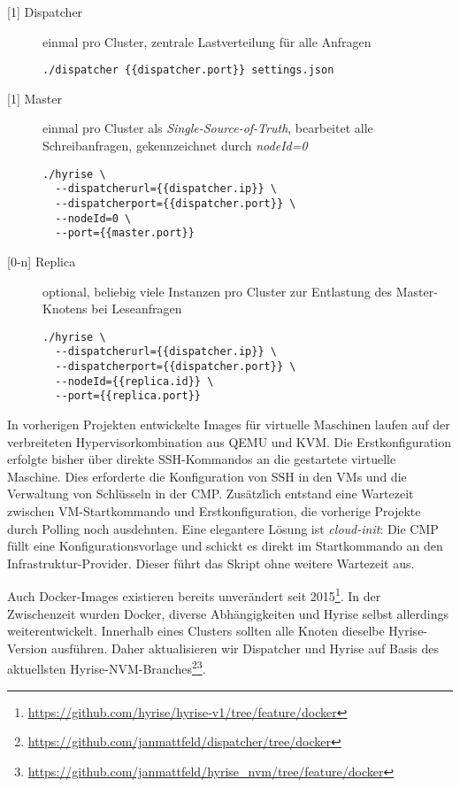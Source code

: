\begin{description}
	
\item[{[1]} Dispatcher] einmal pro Cluster, zentrale Lastverteilung für alle Anfragen
	
\begin{verbatim}
./dispatcher {{dispatcher.port}} settings.json
\end{verbatim}
	
\item[{[1]} Master] einmal pro Cluster als \emph{Single-Source-of-Truth}, bearbeitet alle Schreibanfragen, gekennzeichnet durch \emph{nodeId=0}
	
\begin{verbatim}
./hyrise \
  --dispatcherurl={{dispatcher.ip}} \
  --dispatcherport={{dispatcher.port}} \
  --nodeId=0 \
  --port={{master.port}}
\end{verbatim}

\item[{[0-n]} Replica] optional, beliebig viele Instanzen pro Cluster zur Entlastung des Master-Knotens bei Leseanfragen

\begin{verbatim}
./hyrise \
  --dispatcherurl={{dispatcher.ip}} \
  --dispatcherport={{dispatcher.port}} \
  --nodeId={{replica.id}} \
  --port={{replica.port}}
\end{verbatim}
	
\end{description}

In vorherigen Projekten entwickelte Images für virtuelle Maschinen laufen auf der verbreiteten Hypervisorkombination aus QEMU und KVM. Die Erstkonfiguration erfolgte bisher über direkte SSH-Kommandos an die gestartete virtuelle Maschine. Dies erforderte die Konfiguration von SSH in den VMs und die Verwaltung von Schlüsseln in der CMP. Zusätzlich entstand eine Wartezeit zwischen VM-Startkommando und Erstkonfiguration, die vorherige Projekte durch Polling noch ausdehnten. Eine elegantere Lösung ist \emph{cloud-init}: Die CMP füllt eine Konfigurationsvorlage und schickt es direkt im Startkommando an den Infrastruktur-Provider. Dieser führt das Skript ohne weitere Wartezeit aus.

Auch Docker-Images existieren bereits unverändert seit 2015\footnote{\url{https://github.com/hyrise/hyrise-v1/tree/feature/docker}}. In der Zwischenzeit wurden Docker, diverse Abhängigkeiten und Hyrise selbst allerdings weiterentwickelt. Innerhalb eines Clusters sollten alle Knoten dieselbe Hyrise-Version ausführen. Daher aktualisieren wir Dispatcher und Hyrise auf Basis des aktuellsten Hyrise-NVM-Branches\footnote{\url{https://github.com/janmattfeld/dispatcher/tree/docker}}\footnote{\url{https://github.com/janmattfeld/hyrise_nvm/tree/feature/docker}}.

